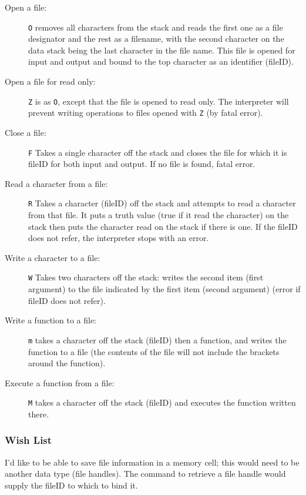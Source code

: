 \documentclass[12pt]{article}
\begin{document}
\begin{description}
\item[Open a file:]  {\tt O} removes all characters from the stack
and reads the first one as a file designator and the rest as a filename,
with the second character on the data stack being the last character in the
file name.  This file is opened for input and output and bound to the
top character as an identifier (fileID).

\item[Open a file for read only:]  {\tt Z} is as {\tt O}, except that
the file is opened to read only.  The interpreter will prevent writing
operations to files opened with {\tt Z} (by fatal error).

\item[Close a file:] {\tt F} Takes a single character off the stack and closes
the file for which it is fileID for both input and output.  If no file
is found, fatal error.

\item[Read a character from a file:]  {\tt R} Takes a character (fileID)
off the stack and attempts to read a character from that file.
It puts a truth value (true if it read the character) on the stack
then puts the character read on the stack if there is one.  If the
fileID does not refer, the interpreter stops with an error.

\item[Write a character to a file:] {\tt W} Takes two characters off the stack:
writes the second item (first argument) to the file indicated by the
first item (second argument) (error if fileID does not refer).

\item[Write a function to a file:] {\tt m} takes a character off the
stack (fileID) then a function, and writes the function to a file (the
contents of the file will not include the brackets around the
function).

\item[Execute a function from a file:]  {\tt M} takes a character off the stack
(fileID) and executes the function written there.
\end{description}


\subsubsection{Wish List}

I'd like to be able to save file information in a memory cell; this would
need to be another data type (file handles).  The command to retrieve a
file handle would supply the fileID to which to bind it.
\end{document}
